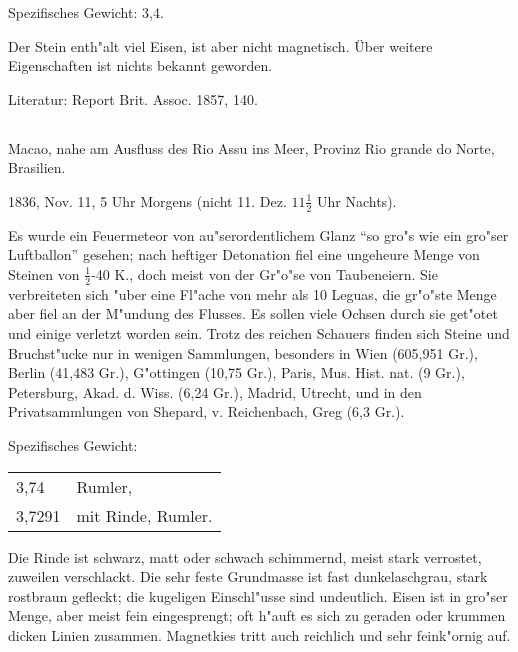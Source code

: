 \documentclass[a4paper, 11pt, oneside]{article}
\begin{document}
Spezifisches Gewicht: 3,4.

Der Stein enth"alt viel Eisen, ist aber nicht magnetisch. Über weitere Eigenschaften ist nichts bekannt geworden.

\normalsize
Literatur: Report Brit. Assoc. 1857, 140.

\subsection{}
\LARGE
\paragraph{}
Macao, nahe am Ausfluss des Rio Assu ins Meer, Provinz Rio grande do Norte, Brasilien.

1836, Nov. 11, 5 Uhr Morgens (nicht 11. Dez. $\mathfrak{11\frac{1}{2}}$ Uhr Nachts).

Es wurde ein Feuermeteor von au"serordentlichem Glanz "`so gro"s wie ein gro"ser Luftballon"' gesehen; nach heftiger Detonation fiel eine ungeheure Menge von Steinen von $\mathfrak{\frac{1}{2}}$-40 K., doch meist von der Gr"o"se von Taubeneiern. Sie verbreiteten sich "uber eine Fl"ache von mehr als 10 Leguas, die gr"o"ste Menge aber fiel an der M"undung des Flusses. Es sollen viele Ochsen durch sie get"otet und einige verletzt worden sein. Trotz des reichen Schauers finden sich Steine und Bruchst"ucke nur in wenigen Sammlungen, besonders in Wien (605,951 Gr.), Berlin (41,483 Gr.), G"ottingen (10,75 Gr.), Paris, Mus. Hist. nat. (9 Gr.), Petersburg, Akad. d. Wiss. (6,24 Gr.), Madrid, Utrecht, und in den Privatsammlungen von Shepard, v. Reichenbach, Greg (6,3 Gr.).

Spezifisches Gewicht:  
\begin{table}[!ht]
    \centering\swabfamily\Large
    \begin{tabular}{l l}
        3,74 & Rumler,\\
        3,7291 & mit Rinde, Rumler.
    \end{tabular}
\end{table}

Die Rinde ist schwarz, matt oder schwach schimmernd, meist stark verrostet, zuweilen verschlackt. Die sehr feste Grundmasse ist fast dunkelaschgrau, stark rostbraun gefleckt; die kugeligen Einschl"usse sind undeutlich. Eisen ist in gro"ser Menge, aber meist fein eingesprengt; oft h"auft es sich zu geraden oder krummen dicken Linien zusammen. Magnetkies tritt auch reichlich und sehr feink"ornig auf.
\end{document}
